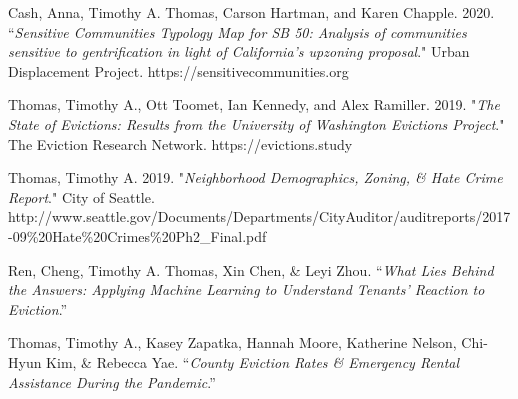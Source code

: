 \begin{cvparagraph}

Cash, Anna, Timothy A. Thomas, Carson Hartman, and Karen Chapple. 2020. “\emph{Sensitive Communities Typology Map for SB 50: Analysis of communities sensitive to gentrification in light of California's upzoning proposal}." Urban Displacement Project. https://sensitivecommunities.org
\end{cvparagraph}

\begin{cvparagraph}

Thomas, Timothy A., Ott Toomet, Ian Kennedy, and Alex Ramiller. 2019. "\emph{The State of Evictions: Results from the University of Washington Evictions Project}." The Eviction Research Network. https://evictions.study
\end{cvparagraph}

\begin{cvparagraph}

Thomas, Timothy A. 2019. "\emph{Neighborhood Demographics, Zoning, \& Hate Crime Report}." City of Seattle.\\
http://www.seattle.gov/Documents/Departments/CityAuditor/auditreports/2017-09\%20Hate\%20Crimes\%20Ph2\_Final.pdf
\end{cvparagraph}

\begin{cvparagraph}


Ren, Cheng, Timothy A. Thomas, Xin Chen, \& Leyi Zhou. “\emph{What Lies Behind the Answers: Applying Machine Learning to Understand Tenants’ Reaction to Eviction}.”

\end{cvparagraph}

\begin{cvparagraph}


Thomas, Timothy A., Kasey Zapatka, Hannah Moore, Katherine Nelson, Chi-Hyun Kim, \& Rebecca Yae. “\emph{County Eviction Rates \& Emergency Rental Assistance During the Pandemic}.”

\end{cvparagraph}


